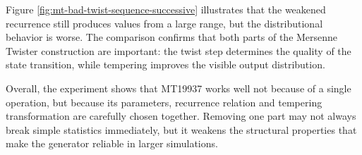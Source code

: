 Figure \ref{fig:mt-bad-twist-sequence-successive} illustrates that the weakened recurrence still produces values from a large range, but the distributional behavior is worse. The comparison confirms that both parts of the Mersenne Twister construction are important: the twist step determines the quality of the state transition, while tempering improves the visible output distribution.

Overall, the experiment shows that MT19937 works well not because of a single operation, but because its parameters, recurrence relation and tempering transformation are carefully chosen together. Removing one part may not always break simple statistics immediately, but it weakens the structural properties that make the generator reliable in larger simulations.
